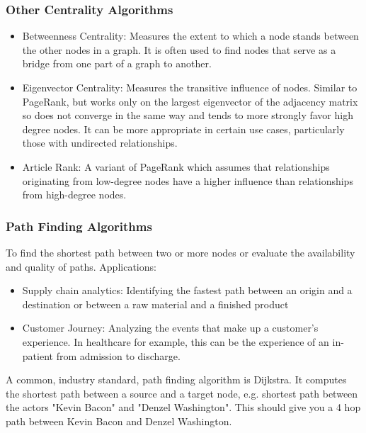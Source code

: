 \begin{frame}[fragile]\frametitle{Other Centrality Algorithms}

 
\begin{itemize}
\item Betweenness Centrality: Measures the extent to which a node stands between the other nodes in a graph. It is often used to find nodes that serve as a bridge from one part of a graph to another.
\item Eigenvector Centrality: Measures the transitive influence of nodes. Similar to PageRank, but works only on the largest eigenvector of the adjacency matrix so does not converge in the same way and tends to more strongly favor high degree nodes. It can be more appropriate in certain use cases, particularly those with undirected relationships.
\item Article Rank: A variant of PageRank which assumes that relationships originating from low-degree nodes have a higher influence than relationships from high-degree nodes.
\end{itemize}


\end{frame}



\begin{frame}[fragile]\frametitle{Path Finding Algorithms}

 To find the shortest path between two or more nodes or evaluate the availability and quality of paths. Applications:
 
\begin{itemize}
\item  Supply chain analytics: Identifying the fastest path between an origin and a destination or between a raw material and a finished product
\item  Customer Journey: Analyzing the events that make up a customer’s experience. In healthcare for example, this can be the experience of an in-patient from admission to discharge.
\end{itemize}

A common, industry standard, path finding algorithm is Dijkstra. It computes the shortest path between a source and a target node, e.g. shortest path between the actors "Kevin Bacon" and "Denzel Washington". This should give you a 4 hop path between Kevin Bacon and Denzel Washington.

\end{frame}


